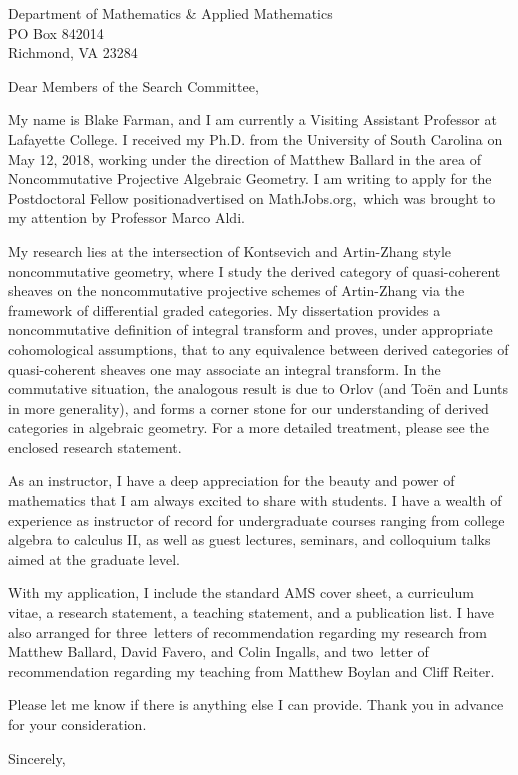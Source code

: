 \documentclass[10pt]{letter}
\date{\today}
\def\position{Postdoctoral Fellow position}
\def\posloc{MathJobs.org}
\def\materials{the standard AMS cover sheet,
  a curriculum vitae,
  a research statement,
  a teaching statement,
  and a publication list}
\def\numresrefs{three}
\def\numteachrefs{two}
\def\refs{Matthew Ballard,
  David Favero,
  and Colin Ingalls}
\def\teachingrefs{Matthew Boylan and Cliff Reiter}
\def\ReferencesBlurbListOnly{I have also provided contact information for \numresrefs\ letters of recommendation regarding my research from \refs, and \numteachrefs\ letters of recommendation regarding my teaching from \teachingrefs.}
\def\ReferencesBlurbBoth{I have also arranged for \numresrefs\  letters of recommendation regarding my research from \refs, and \numteachrefs\ letter of recommendation regarding my teaching from \teachingrefs.}
\def\ReferencesBlurbResearchOnly{
  I have also arranged for \numresrefs\ letters of recommendation regarding my research from \refs.}
\def\researchblurb{My research lies at the intersection of Kontsevich and Artin-Zhang style noncommutative geometry, where I study the derived category of quasi-coherent sheaves on the noncommutative projective schemes of Artin-Zhang via the framework of differential graded categories.
  My dissertation provides a noncommutative definition of integral transform and proves, under appropriate cohomological assumptions, that to any equivalence between derived categories of quasi-coherent sheaves one may associate an integral transform.
  In the commutative situation, the analogous result is due to Orlov (and To\"{e}n and Lunts in more generality), and forms a corner stone for our understanding of derived categories in algebraic geometry.
  For a more detailed treatment, please see the enclosed research statement.}
\def\teachingblurb{As an instructor, I have a deep appreciation for the beauty and power of mathematics that I am always excited to share with students.
  I have a wealth of experience as instructor of record for undergraduate courses ranging from college algebra to calculus II, as well as guest lectures, seminars, and colloquium talks aimed at the graduate level.
  
}
\begin{document}
\begin{letter}{
    Department of Mathematics \& Applied Mathematics\\
    PO Box 842014\\
    Richmond, VA 23284\\
}
  \opening{Dear Members of the Search Committee,}
  
  My name is Blake Farman, and I am currently a Visiting Assistant Professor at Lafayette College.
  I received my Ph.D. from the University of South Carolina on May 12, 2018, working under the direction of Matthew Ballard in the area of Noncommutative Projective Algebraic Geometry.
  I am writing to apply for the \position advertised on \posloc,\, which was brought to my attention by Professor Marco Aldi.

  \researchblurb

  \teachingblurb
  
  With my application, I include \materials.
  \ReferencesBlurbBoth

  Please let me know if there is anything else I can provide.
  Thank you in advance for your consideration.
  \closing{Sincerely,}
\end{letter}
\end{document}
